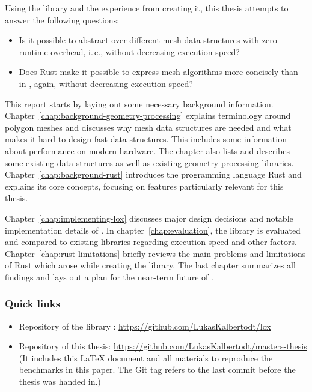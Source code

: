 \newpage

Using the library  and the experience from creating it, this thesis attempts to answer the following questions:

\begin{itemize}
  \item Is it possible to abstract over different mesh data structures with zero runtime overhead, i.\,e., without decreasing execution speed?
  \item Does Rust make it possible to express mesh algorithms more concisely than in \cpp, again, without decreasing execution speed?
\end{itemize}


\vspace{1cm}

This report starts by laying out some necessary background information.
Chapter~\ref{chap:background-geometry-processing} explains terminology around polygon meshes and discusses why mesh data structures are needed and what makes it hard to design fast data structures.
This includes some information about performance on modern hardware.
The chapter also lists and describes some existing data structures as well as existing geometry processing libraries.
Chapter~\ref{chap:background-rust} introduces the programming language Rust and explains its core concepts, focusing on features particularly relevant for this thesis.

Chapter~\ref{chap:implementing-lox} discusses major design decisions and notable implementation details of .
In chapter~\ref{chap:evaluation}, the library is evaluated and compared to existing libraries regarding execution speed and other factors.
Chapter~\ref{chap:rust-limitations} briefly reviews the main problems and limitations of Rust which arose while creating the library.
The last chapter summarizes all findings and lays out a plan for the near-term future of .


\vfill

\subsubsection*{Quick links}
\begin{itemize}
  \item Repository of the library : \textcolor{link-blue}{\url{https://github.com/LukasKalbertodt/lox}}
  \item Repository of this thesis: \textcolor{link-blue}{\url{https://github.com/LukasKalbertodt/masters-thesis}}\\
  {\footnotesize (It includes this \LaTeX{} document and all materials to reproduce the benchmarks in this paper.
  The Git tag  refers to the last commit before the thesis was handed in.)}
\end{itemize}

\vspace{2cm}
